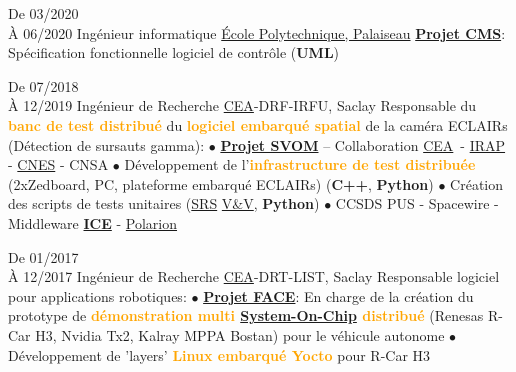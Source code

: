 \documentclass[
	a4paper,
	subsectioncolor=cvblue!70,
]{fortysecondscv}
\newcommand{\cea}{\href{http://www.cea.fr/}{CEA}}
\newcommand{\hl}[1]{\textbf{\textcolor{orange}{#1}}}
\begin{document}
\begin{cvtable}[2]
  \cvitem
      {De 03/2020\\À 06/2020}
      {Ingénieur informatique}
      {\href{https://www.polytechnique.edu/fr/le-laboratoire-leprince-ringuet-llr}{École
      Polytechnique, Palaiseau}}
  {
    \textbf{\href{http://polywww.in2p3.fr/-cms-45-?lang=fr}{Projet CMS}}:
    Spécification fonctionnelle logiciel de contrôle (\textbf{UML})
  }

  \cvitem
      {De 07/2018\\À 12/2019}
      {Ingénieur de Recherche}
      {\cea-DRF-IRFU, Saclay}
  {
    Responsable du \hl{banc de test distribué} du \hl{logiciel embarqué spatial} de la
    caméra ECLAIRs (Détection de sursauts gamma):
    \newline $\bullet$ {
      \hl{\href{http://www.svom.fr/}{Projet SVOM}} -- Collaboration
      \cea\ - \href{http://www.irap.omp.eu/}{IRAP} -
      \href{https://cnes.fr/fr}{CNES} - CNSA
    }
    \newline $\bullet$ {
      Développement de l'\hl{infrastructure de test distribuée} (2xZedboard, PC,
      plateforme embarqué ECLAIRs) (\textbf{C++}, \textbf{Python})
    }
    \newline $\bullet$ {
      Création des scripts de tests unitaires
      (\href{https://en.wikipedia.org/wiki/Software_requirements_specification}{SRS}
      \href{https://en.wikipedia.org/wiki/Software_verification_and_validation}{V\&V},
      \textbf{Python})
    }
    \newline $\bullet$ {
      CCSDS PUS - Spacewire - Middleware
      \href{https://zeroc.com/products/ice}{\textbf{ICE}} -
      \href{https://www.plm.automation.siemens.com/global/en/products/polarion/}{Polarion}
    }
  }

  \cvitem
      {De 01/2017\\À 12/2017}
      {Ingénieur de Recherche}
      {\cea-DRT-LIST, Saclay}
  {
    Responsable logiciel pour applications robotiques:
    \newline $\bullet$ {
      \textbf{\href{https://www.designspot.fr/portfolio/face/}{Projet FACE}}: En
      charge de la création du prototype de \hl{démonstration multi
        \href{https://en.wikipedia.org/wiki/System_on_a_chip}{System-On-Chip}
        distribué} (Renesas R-Car H3, Nvidia Tx2, Kalray MPPA Bostan) pour
      le véhicule autonome
    }
    \newline $\bullet$ {
      Développement de 'layers' \hl{Linux embarqué Yocto} pour R-Car H3
    }
  }


\end{cvtable}
\end{document}

